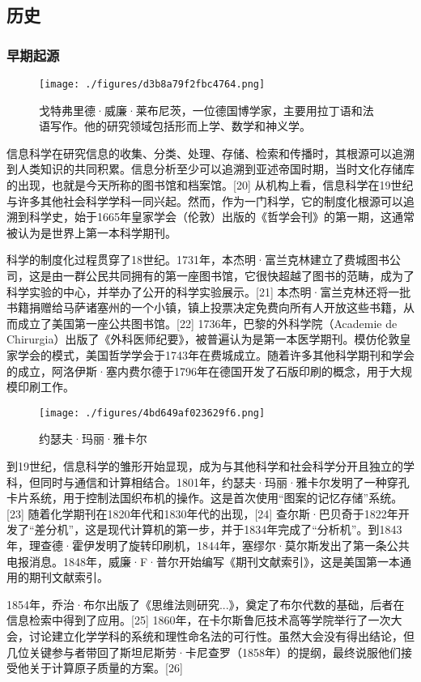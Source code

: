 \subsection{历史}  
\subsubsection{早期起源}
\begin{figure}[ht]
\centering
\texttt{[image: ./figures/d3b8a79f2fbc4764.png]}
\caption{戈特弗里德·威廉·莱布尼茨，一位德国博学家，主要用拉丁语和法语写作。他的研究领域包括形而上学、数学和神义学。} \label{fig_INCE_2}
\end{figure}
信息科学在研究信息的收集、分类、处理、存储、检索和传播时，其根源可以追溯到人类知识的共同积累。信息分析至少可以追溯到亚述帝国时期，当时文化存储库的出现，也就是今天所称的图书馆和档案馆。[20] 从机构上看，信息科学在19世纪与许多其他社会科学学科一同兴起。然而，作为一门科学，它的制度化根源可以追溯到科学史，始于1665年皇家学会（伦敦）出版的《哲学会刊》的第一期，这通常被认为是世界上第一本科学期刊。

科学的制度化过程贯穿了18世纪。1731年，本杰明·富兰克林建立了费城图书公司，这是由一群公民共同拥有的第一座图书馆，它很快超越了图书的范畴，成为了科学实验的中心，并举办了公开的科学实验展示。[21] 本杰明·富兰克林还将一批书籍捐赠给马萨诸塞州的一个小镇，镇上投票决定免费向所有人开放这些书籍，从而成立了美国第一座公共图书馆。[22] 1736年，巴黎的外科学院（Academie de Chirurgia）出版了《外科医师纪要》，被普遍认为是第一本医学期刊。模仿伦敦皇家学会的模式，美国哲学学会于1743年在费城成立。随着许多其他科学期刊和学会的成立，阿洛伊斯·塞内费尔德于1796年在德国开发了石版印刷的概念，用于大规模印刷工作。


\begin{figure}[ht]
\centering
\texttt{[image: ./figures/4bd649af023629f6.png]}
\caption{约瑟夫·玛丽·雅卡尔} \label{fig_INCE_3}
\end{figure}
到19世纪，信息科学的雏形开始显现，成为与其他科学和社会科学分开且独立的学科，但同时与通信和计算相结合。1801年，约瑟夫·玛丽·雅卡尔发明了一种穿孔卡片系统，用于控制法国织布机的操作。这是首次使用“图案的记忆存储”系统。[23] 随着化学期刊在1820年代和1830年代的出现，[24] 查尔斯·巴贝奇于1822年开发了“差分机”，这是现代计算机的第一步，并于1834年完成了“分析机”。到1843年，理查德·霍伊发明了旋转印刷机，1844年，塞缪尔·莫尔斯发出了第一条公共电报消息。1848年，威廉·F·普尔开始编写《期刊文献索引》，这是美国第一本通用的期刊文献索引。

1854年，乔治·布尔出版了《思维法则研究...》，奠定了布尔代数的基础，后者在信息检索中得到了应用。[25] 1860年，在卡尔斯鲁厄技术高等学院举行了一次大会，讨论建立化学学科的系统和理性命名法的可行性。虽然大会没有得出结论，但几位关键参与者带回了斯坦尼斯劳·卡尼查罗（1858年）的提纲，最终说服他们接受他关于计算原子质量的方案。[26]


